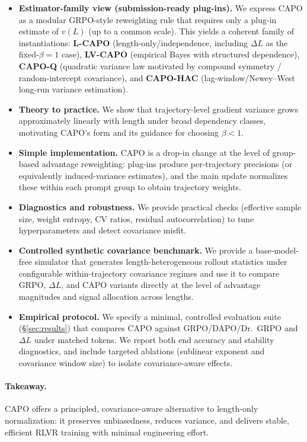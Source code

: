 \begin{itemize}
  \item \textbf{Estimator-family view (submission-ready plug-ins).} We express CAPO as a modular GRPO-style reweighting rule that requires only a plug-in estimate of $v(L)$ (up to a common scale). This yields a coherent family of instantiations: \textbf{L-CAPO} (length-only/independence, including $\Delta L$ as the fixed-$\beta{=}1$ case), \textbf{LV-CAPO} (empirical Bayes with structured dependence), \textbf{CAPO-Q} (quadratic variance law motivated by compound symmetry / random-intercept covariance), and \textbf{CAPO-HAC} (lag-window/Newey--West long-run variance estimation).
  \item \textbf{Theory to practice.} We show that trajectory-level gradient variance grows approximately linearly with length under broad dependency classes, motivating CAPO’s form and its guidance for choosing $\beta<1$.
  \item \textbf{Simple implementation.} CAPO is a drop-in change at the level of group-based advantage reweighting: plug-ins produce per-trajectory precisions (or equivalently induced-variance estimates), and the main update normalizes these within each prompt group to obtain trajectory weights.
  \item \textbf{Diagnostics and robustness.} We provide practical checks (effective sample size, weight entropy, CV ratios, residual autocorrelation) to tune hyperparameters and detect covariance misfit.
  \item \textbf{Controlled synthetic covariance benchmark.} We provide a base-model-free simulator that generates length-heterogeneous rollout statistics under configurable within-trajectory covariance regimes and use it to compare GRPO, $\Delta L$, and CAPO variants directly at the level of advantage magnitudes and signal allocation across lengths.
  \item \textbf{Empirical protocol.} We specify a minimal, controlled evaluation suite (\S\ref{sec:results}) that compares CAPO against GRPO/DAPO/Dr.~GRPO and $\Delta L$ under matched tokens. We report both end accuracy and stability diagnostics, and include targeted ablations (sublinear exponent and covariance window size) to isolate covariance-aware effects.
\end{itemize}

\paragraph{Takeaway.}
CAPO offers a principled, covariance-aware alternative to length-only normalization: it preserves unbiasedness, reduces variance, and delivers stable, efficient RLVR training with minimal engineering effort.
